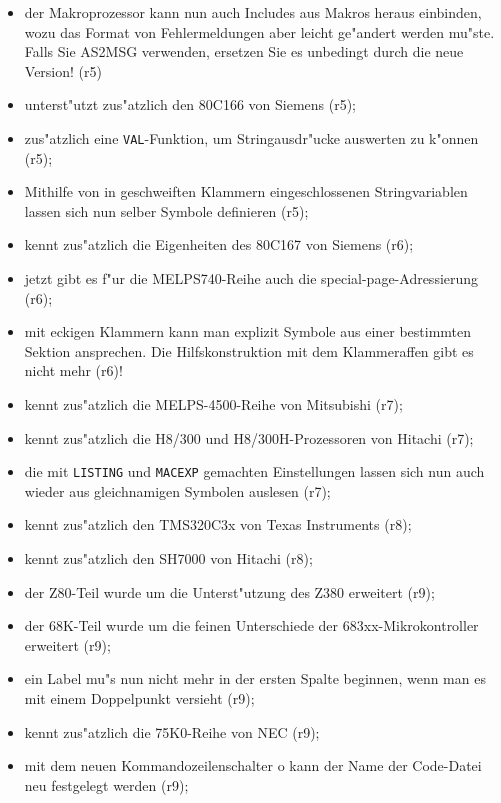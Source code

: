 \documentclass[12pt,a4paper,twoside]{report}
\newcommand{\tty}[1]{{\tt #1}}
\begin{document}
\begin{itemize}
{\begin{itemize}
      \item{der Makroprozessor kann nun auch Includes aus Makros
            heraus einbinden, wozu das Format von Fehlermeldungen
            aber leicht ge"andert werden mu"ste.  Falls Sie AS2MSG
            verwenden, ersetzen Sie es unbedingt durch die neue
            Version! (r5)}
      \item{unterst"utzt zus"atzlich den 80C166 von Siemens (r5);}
      \item{zus"atzlich eine \tty{VAL}-Funktion, um Stringausdr"ucke auswerten
            zu k"onnen (r5);}
      \item{Mithilfe von in geschweiften Klammern eingeschlossenen
            Stringvariablen lassen sich nun selber Symbole definieren
            (r5);}
      \item{kennt zus"atzlich die Eigenheiten des 80C167 von Siemens (r6);}
      \item{jetzt gibt es f"ur die MELPS740-Reihe auch die
            special-page-Adressierung (r6);}
      \item{mit eckigen Klammern kann man explizit Symbole aus einer
            bestimmten Sektion ansprechen.  Die Hilfskonstruktion mit dem
            Klammeraffen gibt es nicht mehr (r6)!}
      \item{kennt zus"atzlich die MELPS-4500-Reihe von Mitsubishi (r7);}
      \item{kennt zus"atzlich die H8/300 und H8/300H-Prozessoren von
            Hitachi (r7);}
      \item{die mit \tty{LISTING} und \tty{MACEXP} gemachten Einstellungen
            lassen sich nun auch wieder aus gleichnamigen Symbolen auslesen
            (r7);}
      \item{kennt zus"atzlich den TMS320C3x von Texas Instruments (r8);}
      \item{kennt zus"atzlich den SH7000 von Hitachi (r8);}
      \item{der Z80-Teil wurde um die Unterst"utzung des Z380 erweitert (r9);}
      \item{der 68K-Teil wurde um die feinen Unterschiede der
            683xx-Mikrokontroller erweitert (r9);}
      \item{ein Label mu"s nun nicht mehr in der ersten Spalte beginnen,
            wenn man es mit einem Doppelpunkt versieht (r9);}
      \item{kennt zus"atzlich die 75K0-Reihe von NEC (r9);}
      \item{mit dem neuen Kommandozeilenschalter o kann der Name
            der Code-Datei neu festgelegt werden (r9);}

\end{itemize}}
\end{itemize}
\end{document}
